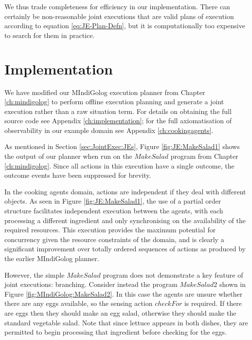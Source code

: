 We thus trade completeness for efficiency in our implementation. There
can certainly be non-reasonable joint executions that are valid plans
of execution according to equation \eqref{eq:JE-Plan-Defn}, but it
is computationally too expensive to search for them in practice.


\section{Implementation\label{sec:JointExec:Implementation}}

We have modified our MIndiGolog execution planner from Chapter \ref{ch:mindigolog}
to perform offline execution planning and generate a joint execution
rather than a raw situation term. For details on obtaining the full
source code see Appendix \ref{ch:implementation}; for the full axiomatisation
of observability in our example domain see Appendix \ref{ch:cookingagents}.

As mentioned in Section \ref{sec:JointExec:JEs}, Figure \ref{fig:JE:MakeSalad1}
shows the output of our planner when run on the $MakeSalad$ program
from Chapter \ref{ch:mindigolog}. Since all actions in this execution
have a single outcome, the outcome events have been suppressed for
brevity.

In the cooking agents domain, actions are independent if they deal
with different objects. As seen in Figure \ref{fig:JE:MakeSalad1},
the use of a partial order structure facilitates independent execution
between the agents, with each processing a different ingredient and
only synchronising on the availability of the required resources.
This execution provides the maximum potential for concurrency given
the resource constraints of the domain, and is clearly a significant
improvement over totally ordered sequences of actions as produced
by the earlier MIndiGolog planner.

However, the simple $MakeSalad$ program does not demonstrate a key
feature of joint executions: branching. Consider instead the program
$MakeSalad2$ shown in Figure \ref{fig:MIndiGolog:MakeSalad2}. In
this case the agents are unsure whether there are any eggs available,
so the sensing action $checkFor$ is required. If there are eggs then
they should make an egg salad, otherwise they should make the standard
vegetable salad. Note that since lettuce appears in both dishes, they
are permitted to begin processing that ingredient before checking
for the eggs.

